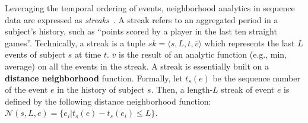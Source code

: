 Leveraging the temporal ordering of events, neighborhood analytics in sequence data are expressed as \emph{streaks}~\cite{zhang2014discovering}. A streak refers to an aggregated period in a subject's history, such as ``points scored by a player in the last ten straight games''. Technically, a streak is a tuple $sk=\langle s, L, t, \overline{v} \rangle$
which represents the last $L$ events of subject $s$ at time $t$. $\overline{v}$
is the result of an analytic function (e.g., min, average)
on all the events in the streak. A streak is essentially 
built on  a \textbf{distance neighborhood} function. Formally,
let $t_s(e)$ be the sequence number of the event $e$ in the history of subject $s$.
Then, a length-$L$ streak of event $e$ is 
defined by the following distance neighborhood
function: $\mathcal{N}(s,L,e) = \{e_i | t_s(e) - t_s(e_i) \leq L \}$.
%

%

